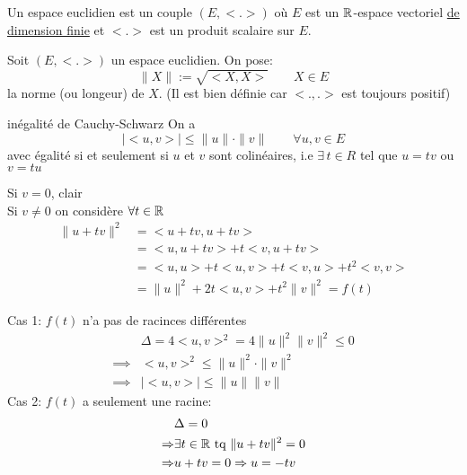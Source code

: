 \begin{definition}
    Un espace euclidien est un couple $(E, < . >)$ où $E$ est un  $\mathbb{R}$-espace vectoriel \underline{de dimension finie} et  $< . >$ est un produit scalaire sur  $E$.
\end{definition}
\begin{property} Soit $(E, < . >)$ un espace euclidien. On pose:
    \[
    \|X\| := \sqrt{<X,X>} \qquad X \in E 
    \] 
    la norme (ou longeur) de $X$. (Il est bien définie car $<., .>$ est toujours positif)
\end{property}
\begin{lemma}\label{lemma:inegalite-cauchy-schwarz} inégalité de Cauchy-Schwarz
   On a
   \[
   |<u, v>| \le \|u\| \cdot \|v\| \qquad \forall u, v \in E
   \] 
   avec égalité si et seulement si $u$ et  $v$ sont colinéaires, i.e  $\exists \, t \in R$ tel que $u = tv$ ou  $v = tu$
\end{lemma}
\begin{explanation}
   Si $v = 0$, clair\\
   Si $v \neq 0$ on considère $\forall t \in \mathbb{R}$
   \begin{align*}
       \|u + tv\|^2 &= <u + tv, u + tv>\\ 
                    &= <u, u + tv> + t<v, u + tv>\\
                    &= <u, u> + t<u, v> + t<v, u> + t^2<v, v>\\
                    &= \|u\|^2 + 2t<u, v> + t^2 \|v\|^2 = f(t)
   \end{align*}
   \begin{center}
   \end{center}
Cas 1: $f(t)$ n'a pas de racinces différentes
\begin{align*}
    &\Delta = 4<u, v>^2 = 4\|u\|^2\|v\|^2 \le 0\\
    \implies & <u, v>^2 \le \|u\|^2 \cdot \|v\|^2\\
    \implies & |<u, v>| \le \|u\|\|v\|
\end{align*}
Cas 2: $f(t)$ a seulement une racine:\\
\begin{align*}
    &\Delta = 0\\
    \Rightarrow & \exists t \in \mathbb{R} \text{ tq } \|u + tv\|^2 = 0\\
    \Rightarrow &u + tv = 0 \Rightarrow u = -tv
\end{align*}
\end{explanation}
